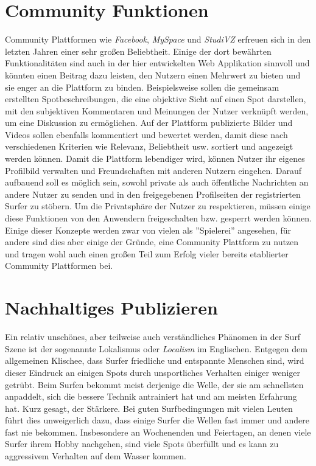 \section{Community Funktionen}
Community Plattformen wie \textit{Facebook}, \textit{MySpace} und
\textit{StudiVZ} erfreuen sich in den letzten Jahren einer sehr großen
Beliebtheit. Einige der dort bewährten Funktionalitäten sind auch in
der hier entwickelten Web Applikation sinnvoll und könnten einen
Beitrag dazu leisten, den Nutzern einen Mehrwert zu bieten und sie
enger an die Plattform zu binden. Beispielsweise sollen die gemeinsam
erstellten Spotbeschreibungen, die eine objektive Sicht auf einen Spot
darstellen, mit den subjektiven Kommentaren und Meinungen der Nutzer
verknüpft werden, um eine Diskussion zu ermöglichen. Auf der Plattform
publizierte Bilder und Videos sollen ebenfalls kommentiert und
bewertet werden, damit diese nach verschiedenen Kriterien wie
Relevanz, Beliebtheit usw. sortiert und angezeigt werden können. Damit
die Plattform lebendiger wird, können Nutzer ihr eigenes Profilbild
verwalten und Freundschaften mit anderen Nutzern eingehen. Darauf
aufbauend soll es möglich sein, sowohl private als auch öffentliche
Nachrichten an andere Nutzer zu senden und in den freigegebenen
Profilseiten der registrierten Surfer zu stöbern. Um die Privatsphäre
der Nutzer zu respektieren, müssen einige diese Funktionen von den
Anwendern freigeschalten bzw. gesperrt werden können. Einige dieser
Konzepte werden zwar von vielen als ''Spielerei'' angesehen, für
andere sind dies aber einige der Gründe, eine Community Plattform zu
nutzen und tragen wohl auch einen großen Teil zum Erfolg vieler
bereits etablierter Community Plattformen bei.

\section{Nachhaltiges Publizieren}
Ein relativ unschönes, aber teilweise auch verständliches Phänomen in
der Surf Szene ist der sogenannte Lokalismus oder \textit{Localism} im
Englischen. Entgegen dem allgemeinen Klischee, dass Surfer friedliche
und entspannte Menschen sind, wird dieser Eindruck an einigen Spots
durch unsportliches Verhalten einiger weniger getrübt. Beim Surfen
bekommt meist derjenige die Welle, der sie am schnellsten anpaddelt,
sich die bessere Technik antrainiert hat und am meisten Erfahrung
hat. Kurz gesagt, der Stärkere. Bei guten Surfbedingungen mit vielen
Leuten führt dies unweigerlich dazu, dass einige Surfer die Wellen
fast immer und andere fast nie bekommen. Insbesondere an Wochenenden
und Feiertagen, an denen viele Surfer ihrem Hobby nachgehen, sind
viele Spots überfüllt und es kann zu aggressivem Verhalten auf dem
Wasser kommen.

